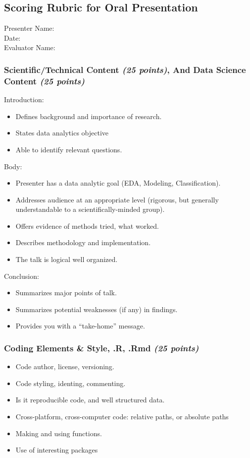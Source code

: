 \documentclass[11pt]{article} %
\begin{document}
\pagebreak
\subsection{Scoring Rubric for Oral Presentation}
Presenter Name:   \\
Date: \\
Evaluator Name: 

\subsubsection{Scientific/Technical Content \emph{(25 points)}, And Data Science Content \emph{(25 points)}}

Introduction: 
\begin{itemize}   \itemsep0pt
    \item{Defines background and importance of research.}
    \item{States data analytics objective}
    \item{Able to identify relevant questions.}
\end{itemize}

\noindent Body:
\begin{itemize}  \itemsep0pt
    \item{Presenter has a data analytic goal (EDA, Modeling, Classification).}
    \item{Addresses audience at an appropriate level (rigorous, but generally understandable to a scientifically-minded group).}
    \item{Offers evidence of methods tried, what worked.}
    \item{Describes methodology and implementation.}
    \item{The talk is logical well organized.}
\end{itemize}

\noindent Conclusion:
\begin{itemize}  \itemsep0pt
    \item{Summarizes major points of talk.}
    \item{Summarizes potential weaknesses (if any) in findings.}
    \item{Provides you with a “take-home” message.}
\end{itemize}

\subsubsection{Coding Elements \& Style, .R, .Rmd \emph{(25 points)}}
\begin{itemize}  \itemsep0pt
    \item{Code author, license, versioning.}
    \item{Code styling, identing, commenting.}
    \item{Is it reproducible code, and well structured data.}
    \item{Cross-platform, cross-computer code: relative paths, or absolute paths}
    \item{Making and using functions.}
    \item{Use of interesting packages}
\end{itemize}
\end{document}
